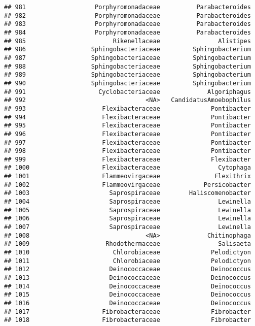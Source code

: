 \documentclass[
]{article}
\begin{document}
\begin{verbatim}
## 981                   Porphyromonadaceae          Parabacteroides
## 982                   Porphyromonadaceae          Parabacteroides
## 983                   Porphyromonadaceae          Parabacteroides
## 984                   Porphyromonadaceae          Parabacteroides
## 985                        Rikenellaceae                Alistipes
## 986                  Sphingobacteriaceae         Sphingobacterium
## 987                  Sphingobacteriaceae         Sphingobacterium
## 988                  Sphingobacteriaceae         Sphingobacterium
## 989                  Sphingobacteriaceae         Sphingobacterium
## 990                  Sphingobacteriaceae         Sphingobacterium
## 991                    Cyclobacteriaceae             Algoriphagus
## 992                                 <NA>   CandidatusAmoebophilus
## 993                     Flexibacteraceae              Pontibacter
## 994                     Flexibacteraceae              Pontibacter
## 995                     Flexibacteraceae              Pontibacter
## 996                     Flexibacteraceae              Pontibacter
## 997                     Flexibacteraceae              Pontibacter
## 998                     Flexibacteraceae              Pontibacter
## 999                     Flexibacteraceae              Flexibacter
## 1000                    Flexibacteraceae                Cytophaga
## 1001                    Flammeovirgaceae               Flexithrix
## 1002                    Flammeovirgaceae            Persicobacter
## 1003                      Saprospiraceae        Haliscomenobacter
## 1004                      Saprospiraceae                Lewinella
## 1005                      Saprospiraceae                Lewinella
## 1006                      Saprospiraceae                Lewinella
## 1007                      Saprospiraceae                Lewinella
## 1008                                <NA>             Chitinophaga
## 1009                     Rhodothermaceae                Salisaeta
## 1010                       Chlorobiaceae              Pelodictyon
## 1011                       Chlorobiaceae              Pelodictyon
## 1012                      Deinococcaceae              Deinococcus
## 1013                      Deinococcaceae              Deinococcus
## 1014                      Deinococcaceae              Deinococcus
## 1015                      Deinococcaceae              Deinococcus
## 1016                      Deinococcaceae              Deinococcus
## 1017                    Fibrobacteraceae              Fibrobacter
## 1018                    Fibrobacteraceae              Fibrobacter

\end{verbatim}
\end{document}
